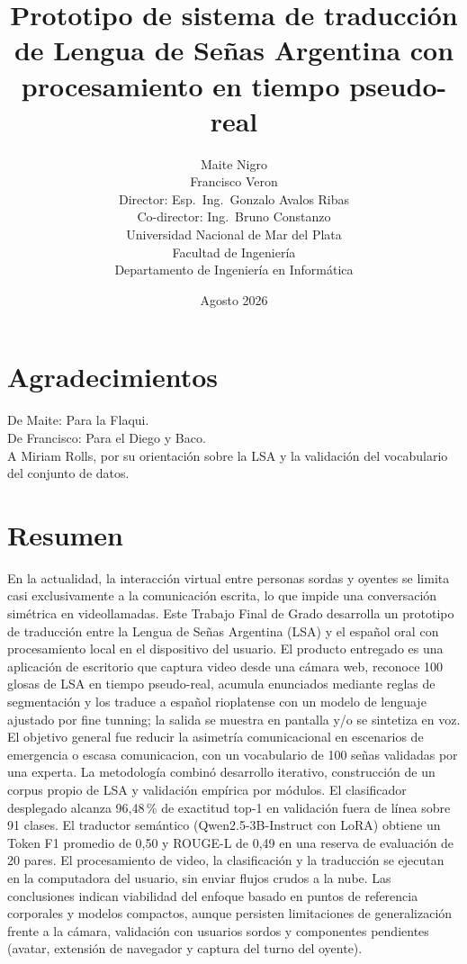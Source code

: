 \documentclass[12pt,a4paper]{report}
\title{Prototipo de sistema de traducción de Lengua de Señas Argentina con procesamiento en tiempo pseudo-real}
\author{Maite Nigro \\ Francisco Veron \\ \vspace{0.5cm} \small Director: Esp.\ Ing.\ Gonzalo Avalos Ribas \\ \vspace{0.5cm} \small Co-director: Ing.\ Bruno Constanzo \\ \vspace{1cm} \small Universidad Nacional de Mar del Plata \\ Facultad de Ingeniería \\ Departamento de Ingeniería en Informática}
\date{Agosto 2026}
\begin{document}
\maketitle

\chapter*{Agradecimientos}
De Maite: Para la Flaqui.\\
De Francisco: Para el Diego y Baco.\\
A Miriam Rolls, por su orientación sobre la LSA y la validación del vocabulario del conjunto de datos.

\tableofcontents

\chapter*{Resumen}
En la actualidad, la interacción virtual entre personas sordas y oyentes se limita casi exclusivamente a la comunicación escrita, lo que impide una conversación simétrica en videollamadas. Este Trabajo Final de Grado desarrolla un prototipo de traducción entre la Lengua de Señas Argentina (LSA) y el español oral con procesamiento local en el dispositivo del usuario. El producto entregado es una aplicación de escritorio que captura video desde una cámara web, reconoce 100 glosas de LSA en tiempo pseudo-real, acumula enunciados mediante reglas de segmentación y los traduce a español rioplatense con un modelo de lenguaje ajustado por fine tunning; la salida se muestra en pantalla y/o se sintetiza en voz. El objetivo general fue reducir la asimetría comunicacional en escenarios de emergencia o escasa comunicacion, con un vocabulario de 100 señas validadas por una experta. La metodología combinó desarrollo iterativo, construcción de un corpus propio de LSA y validación empírica por módulos. El clasificador desplegado alcanza 96,48\,\% de exactitud top-1 en validación fuera de línea sobre 91 clases. El traductor semántico (Qwen2.5-3B-Instruct con LoRA) obtiene un Token F1 promedio de 0,50 y ROUGE-L de 0,49 en una reserva de evaluación de 20 pares. El procesamiento de video, la clasificación y la traducción se ejecutan en la computadora del usuario, sin enviar flujos crudos a la nube. Las conclusiones indican viabilidad del enfoque basado en puntos de referencia corporales y modelos compactos, aunque persisten limitaciones de generalización frente a la cámara, validación con usuarios sordos y componentes pendientes (avatar, extensión de navegador y captura del turno del oyente).
\end{document}
